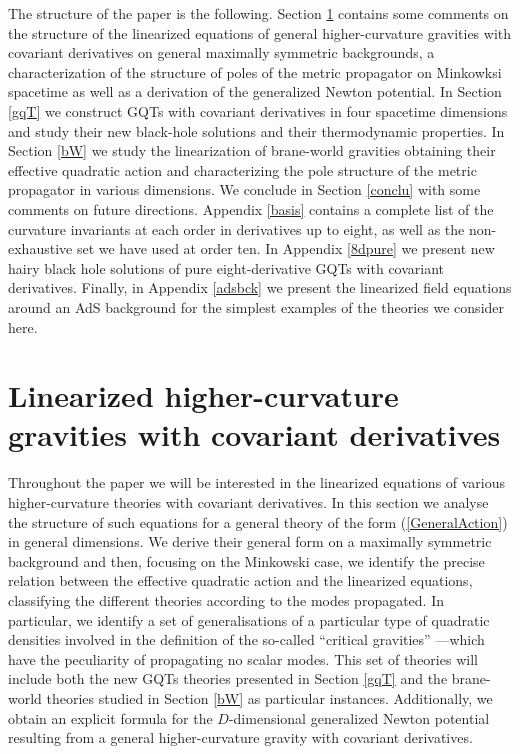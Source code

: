 \documentclass[11pt]{article}
\begin{document}
The structure of the paper is the following. Section \ref{lini} contains some comments on the structure of the linearized equations of  general higher-curvature gravities with covariant derivatives on general maximally symmetric backgrounds, a characterization of the structure of poles of the metric propagator on Minkowksi spacetime as well as a derivation of the generalized Newton potential. In Section \ref{gqT} we construct GQTs with covariant derivatives in four spacetime dimensions and study their new black-hole solutions and their thermodynamic properties. In Section \ref{bW} we study the linearization of brane-world gravities obtaining their effective quadratic action and characterizing the pole structure of the metric propagator in various dimensions. We conclude in Section \ref{conclu} with some comments on future directions. Appendix \ref{basis} contains a complete list of the curvature invariants at each order in derivatives up to eight, as well as the non-exhaustive set we have used at order ten. In Appendix \ref{8dpure} we  present new hairy black hole solutions of pure eight-derivative GQTs with covariant derivatives. Finally, in Appendix \ref{adsbck} we present the linearized field equations around an AdS background for the simplest examples of the theories we consider here.



\section{Linearized higher-curvature gravities with covariant derivatives}\label{lini}
Throughout the paper we will be interested in the linearized equations of various higher-curvature theories with covariant derivatives. In this section we analyse the structure of such equations for a general theory of the form (\ref{GeneralAction}) in general dimensions.
 We derive their general form on a maximally symmetric background and then, focusing on the Minkowski case, we identify the precise relation between the effective quadratic action and the linearized equations, classifying the different theories according to the modes propagated. In particular, we identify a set of generalisations of a particular type of quadratic densities involved in the definition of the so-called ``critical gravities'' ---which have the peculiarity of propagating no scalar modes. This set of theories will include both the new GQTs theories presented in Section \ref{gqT} and the brane-world theories studied in Section \ref{bW} as particular instances. Additionally, we obtain an explicit formula for the $D$-dimensional generalized Newton potential resulting from a general higher-curvature gravity with covariant derivatives. 
 
\end{document}
